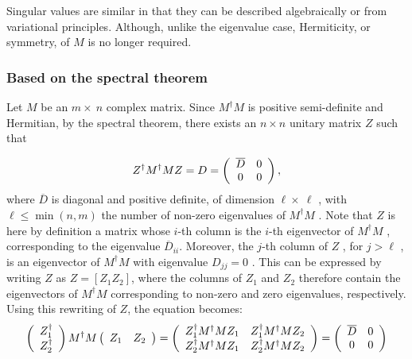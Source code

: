 \documentclass[aps,preprint]{revtex4}%
\begin{document}
Singular values are similar in that they can be described algebraically or
from variational principles. Although, unlike the eigenvalue case,
Hermiticity, or symmetry, of $M$ is no longer required.

\subsubsection{Based on the spectral theorem}

Let $M$ be an $m\times\ n$ complex matrix. Since $M^{\dagger}M$ is positive
semi-definite and Hermitian, by the spectral theorem, there exists an $n\times
n$ unitary matrix $Z$ such that%

\begin{equation}
Z^{\dagger}M^{\dagger}MZ=D=\left(
\begin{array}
[c]{cc}%
\overline{D} & 0\\
0 & 0
\end{array}
\right)  ,
\end{equation}
where $\overline{D}$ is diagonal and positive definite, of dimension
$\ell\times\ \ell$ , with $\ell\leq\min(n,m)$ the number of non-zero
eigenvalues of $M^{\dagger}M$ . Note that $Z$ is here by definition a matrix
whose $i$-th column is the $i$-th eigenvector of $M^{\dagger}M$ ,
corresponding to the eigenvalue $\overline{D}_{ii}$. Moreover, the $j$-th
column of $Z$ , for $j>\ell$ , is an eigenvector of $M^{\dagger}M$ with
eigenvalue $D_{jj}=0$ . This can be expressed by writing $Z$ as $Z=[Z_{1}%
Z_{2}]$, where the columns of $Z_{1}$ and $Z_{2}$ therefore contain the
eigenvectors of $M^{\dagger}M$ corresponding to non-zero and zero eigenvalues,
respectively. Using this rewriting of $Z$, the equation becomes:%
\begin{equation}
\left(
\begin{array}
[c]{c}%
Z_{1}^{\dagger}\\
Z_{2}^{\dagger}%
\end{array}
\right)  M^{\dagger}M\left(
\begin{array}
[c]{cc}%
Z_{1} & Z_{2}%
\end{array}
\right)  =\left(
\begin{array}
[c]{cc}%
Z_{1}^{\dagger}M^{\dagger}MZ_{1} & Z_{1}^{\dagger}M^{\dagger}MZ_{2}\\
Z_{2}^{\dagger}M^{\dagger}MZ_{1} & Z_{2}^{\dagger}M^{\dagger}MZ_{2}%
\end{array}
\right)  =\left(
\begin{array}
[c]{cc}%
\overline{D} & 0\\
0 & 0
\end{array}
\right)
\end{equation}
\end{document}
